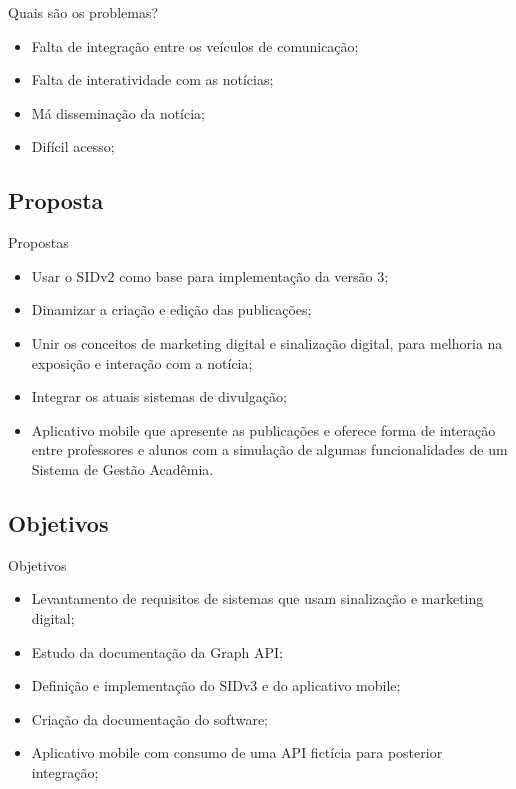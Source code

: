 \documentclass{aula-ifb}
\begin{document}
\begin{frame}{Quais são os problemas?}
\begin{itemize}
   \item Falta de integração entre os veículos de comunicação;
   \vspace{10px}
   \item Falta de interatividade com as notícias;
   \vspace{10px}
   \item Má disseminação da notícia;
   \vspace{10px}
   \item Difícil acesso;
\end{itemize}	 
\end{frame}

\subsection{Proposta}
\begin{frame}{Propostas}
	\begin{itemize}
		\item Usar o SIDv2 como base para implementação da versão 3;
		\vspace{10px}
		\item Dinamizar a criação e edição das publicações;
		\vspace{10px}
		\item Unir os conceitos de marketing digital e sinalização digital, para melhoria na exposição e interação com a notícia;
		\vspace{10px}
		\item Integrar os atuais sistemas de divulgação;
		\vspace{10px}
		\item Aplicativo mobile que apresente as publicações e oferece forma de interação entre professores e alunos com a simulação de algumas funcionalidades de um Sistema de Gestão Acadêmia.
	\end{itemize}
\end{frame}

\subsection{Objetivos}
\begin{frame}{Objetivos}
	\begin{itemize}
   		\item Levantamento de requisitos de sistemas que usam sinalização e marketing digital;
   		\vspace{10px}
   		\item Estudo da documentação da Graph API;
   		\vspace{10px}
   		\item Definição e implementação do SIDv3 e do aplicativo mobile;
   		\vspace{10px}
   		\item Criação da documentação do software;
   		\vspace{10px}
   		\item Aplicativo mobile com consumo de uma API fictícia para posterior integração;
	\end{itemize}
\end{frame}
\end{document}
